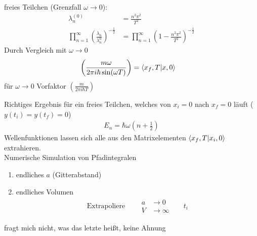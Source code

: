freies Teilchen (Grenzfall $\omega \rightarrow 0$):
	\begin{align*}
		\lambda_n^{(0)} &= \frac{n^2 \pi^2}{T^2} \\
		\prod_{n=1}^{\infty} \left(\frac{\lambda_n}{\lambda_n^0}\right)^{-\frac{1}{2}} &=
		\prod_{n=1}^{\infty} \left(1 - \frac{n^2 \pi^2}{T^2}\right)^{-\frac{1}{2}}
	\end{align*}
Durch Vergleich mit $\omega \rightarrow 0$
	\begin{align*}
		\left(\frac{m \omega}{2 \pi i \hbar \sin(\omega T)}\right) &= 
		\braket{x_f , T | x, 0}
	\end{align*}
für $\omega \rightarrow 0$ Vorfaktor $\left(\frac{m}{2 \pi i \hbar T}\right)$

Richtiges Ergebnis für ein freies Teilchen, welches von $x_i = 0$ nach $x_f = 0$ läuft ($y(t_i)= y(t_f) = 0$) 
	\begin{align*}
		E_n = \hbar \omega\left(n + \frac{1}{2}\right)
	\end{align*}
Wellenfunktionen lassen sich alle aus den Matrixelementen $\braket{x_f, T | x_i , 0}$ extrahieren.
\\
Numerische Simulation von Pfadintegralen
	\begin{enumerate}[1)]
		\item endliches $a$ (Gitterabstand) 
		\item endliches Volumen
		\begin{align*}
			\text{Extrapoliere }& &
			\begin{aligned}
				a &\rightarrow 0 \\
				V &\rightarrow \infty
			\end{aligned}
			& &t_i
		\end{align*}
	\end{enumerate}
fragt mich nicht, was das letzte heißt, keine Ahnung

